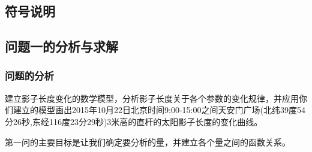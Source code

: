     \subsection{符号说明}

    \subsection{问题一的分析与求解}
        \subsubsection{问题的分析}
            \par
            建立影子长度变化的数学模型，分析影子长度关于各个参数的变化规律，并应用你们建立的模型画出2015年10月22日北京时间9:00-15:00之间天安门广场(北纬39度54分26秒,东经116度23分29秒)3米高的直杆的太阳影子长度的变化曲线。
            \par
            第一问的主要目标是让我们确定要分析的量，并建立各个量之间的函数关系。
